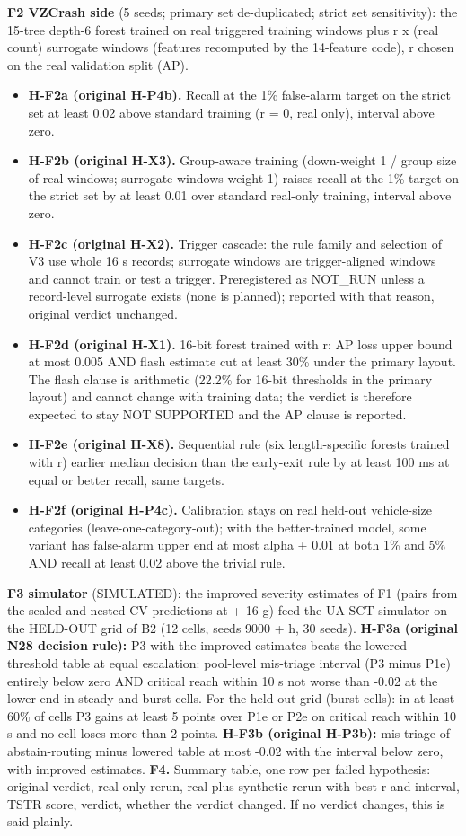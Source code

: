 \textbf{F2 VZCrash side} (5 seeds; primary set de-duplicated; strict set sensitivity): the 15-tree depth-6 forest trained on real triggered training windows plus r x (real count) surrogate windows (features recomputed by the 14-feature code), r chosen on the real validation split (AP).
\begin{itemize}
\item \textbf{H-F2a (original H-P4b).} Recall at the 1\% false-alarm target on the strict set at least 0.02 above standard training (r = 0, real only), interval above zero.
\item \textbf{H-F2b (original H-X3).} Group-aware training (down-weight 1 / group size of real windows; surrogate windows weight 1) raises recall at the 1\% target on the strict set by at least 0.01 over standard real-only training, interval above zero.
\item \textbf{H-F2c (original H-X2).} Trigger cascade: the rule family and selection of V3 use whole 16 s records; surrogate windows are trigger-aligned windows and cannot train or test a trigger. Preregistered as NOT\_RUN unless a record-level surrogate exists (none is planned); reported with that reason, original verdict unchanged.
\item \textbf{H-F2d (original H-X1).} 16-bit forest trained with r: AP loss upper bound at most 0.005 AND flash estimate cut at least 30\% under the primary layout. The flash clause is arithmetic (22.2\% for 16-bit thresholds in the primary layout) and cannot change with training data; the verdict is therefore expected to stay NOT SUPPORTED and the AP clause is reported.
\item \textbf{H-F2e (original H-X8).} Sequential rule (six length-specific forests trained with r) earlier median decision than the early-exit rule by at least 100 ms at equal or better recall, same targets.
\item \textbf{H-F2f (original H-P4c).} Calibration stays on real held-out vehicle-size categories (leave-one-category-out); with the better-trained model, some variant has false-alarm upper end at most alpha + 0.01 at both 1\% and 5\% AND recall at least 0.02 above the trivial rule.
\end{itemize}
\textbf{F3 simulator} (SIMULATED): the improved severity estimates of F1 (pairs from the sealed and nested-CV predictions at +-16 g) feed the UA-SCT simulator on the HELD-OUT grid of B2 (12 cells, seeds 9000 + h, 30 seeds). \textbf{H-F3a (original N28 decision rule):} P3 with the improved estimates beats the lowered-threshold table at equal escalation: pool-level mis-triage interval (P3 minus P1e) entirely below zero AND critical reach within 10 s not worse than -0.02 at the lower end in steady and burst cells. For the held-out grid (burst cells): in at least 60\% of cells P3 gains at least 5 points over P1e or P2e on critical reach within 10 s and no cell loses more than 2 points. \textbf{H-F3b (original H-P3b):} mis-triage of abstain-routing minus lowered table at most -0.02 with the interval below zero, with improved estimates.
\textbf{F4.} Summary table, one row per failed hypothesis: original verdict, real-only rerun, real plus synthetic rerun with best r and interval, TSTR score, verdict, whether the verdict changed. If no verdict changes, this is said plainly.

